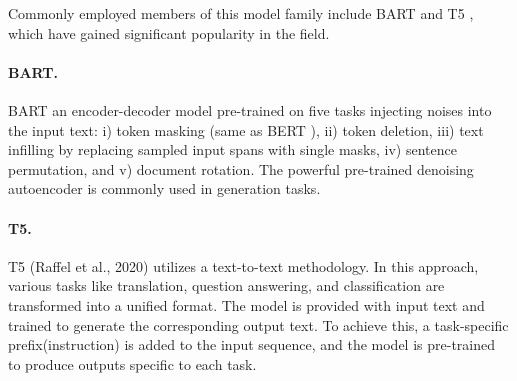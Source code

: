 Commonly employed members of this model family include BART \cite{lewis-etal-2020-bart} and T5 \cite{raffel2020exploring}, which have gained significant popularity in the field.

\paragraph{BART.} BART \cite{lewis-etal-2020-bart} an encoder-decoder model pre-trained on five tasks injecting noises into the input text: i) token masking (same as BERT \cite{devlin2018bert}), ii) token deletion, iii) text infilling by replacing sampled input spans with single masks, iv) sentence permutation, and v) document rotation. The powerful pre-trained denoising autoencoder is commonly used in generation tasks.

\paragraph{T5.} T5 (Raffel et al., 2020) utilizes a text-to-text methodology. In this approach, various tasks like translation, question answering, and classification are transformed into a unified format. The model is provided with input text and trained to generate the corresponding output text. To achieve this, a task-specific prefix(instruction) is added to the input sequence, and the model is pre-trained to produce outputs specific to each task.\\



